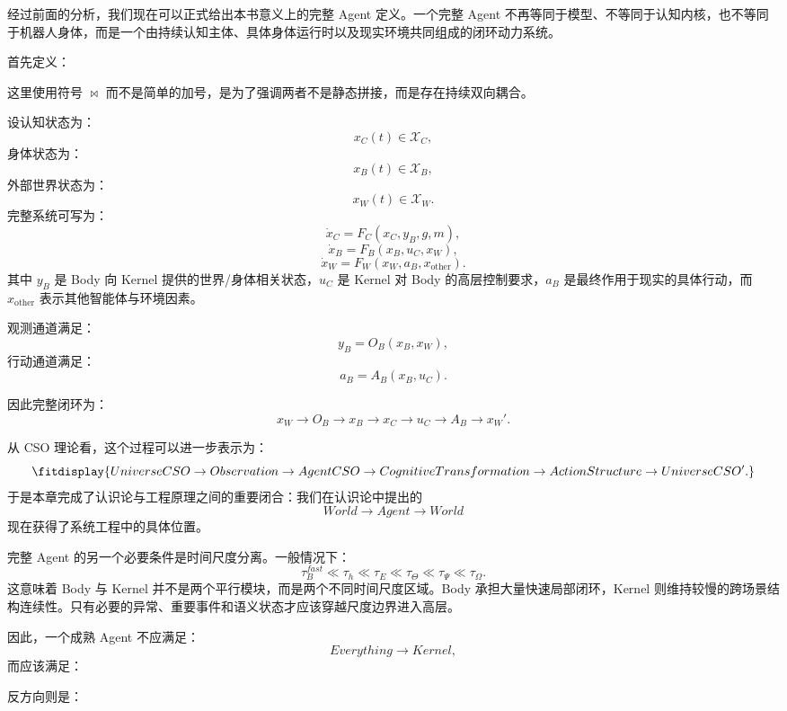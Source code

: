 经过前面的分析，我们现在可以正式给出本书意义上的完整 Agent 定义。一个完整 Agent 不再等同于模型、不等同于认知内核，也不等同于机器人身体，而是一个由持续认知主体、具体身体运行时以及现实环境共同组成的闭环动力系统。

首先定义：
\begin{statementbox}
\centering
{}
\end{statementbox}
这里使用符号 $\bowtie$ 而不是简单的加号，是为了强调两者不是静态拼接，而是存在持续双向耦合。

设认知状态为：
\[
x_C(t)\in\mathcal X_C,
\]
身体状态为：
\[
x_B(t)\in\mathcal X_B,
\]
外部世界状态为：
\[
x_W(t)\in\mathcal X_W.
\]
完整系统可写为：
\[
\dot{x}_C
=
F_C
\left(
x_C,
y_B,
g,
m
\right),
\]
\[
\dot{x}_B
=
F_B
\left(
x_B,
u_C,
x_W
\right),
\]
\[
\dot{x}_W
=
F_W
\left(
x_W,
a_B,
x_{\mathrm{other}}
\right).
\]
其中 $y_B$ 是 Body 向 Kernel 提供的世界/身体相关状态，$u_C$ 是 Kernel 对 Body 的高层控制要求，$a_B$ 是最终作用于现实的具体行动，而 $x_{\mathrm{other}}$ 表示其他智能体与环境因素。

观测通道满足：
\[
y_B
=
O_B
\left(
x_B,x_W
\right),
\]
行动通道满足：
\[
a_B
=
A_B
\left(
x_B,u_C
\right).
\]

因此完整闭环为：
\[
\boxed{
x_W
\rightarrow
O_B
\rightarrow
x_B
\rightarrow
x_C
\rightarrow
u_C
\rightarrow
A_B
\rightarrow
x_W'.
}
\]

从 CSO 理论看，这个过程可以进一步表示为：
\[
\fitdisplay{
UniverseCSO
\rightarrow
Observation
\rightarrow
AgentCSO
\rightarrow
CognitiveTransformation
\rightarrow
ActionStructure
\rightarrow
UniverseCSO'.
}
\]
于是本章完成了认识论与工程原理之间的重要闭合：我们在认识论中提出的
\[
World
\rightarrow
Agent
\rightarrow
World
\]
现在获得了系统工程中的具体位置。

完整 Agent 的另一个必要条件是时间尺度分离。一般情况下：
\[
\tau_B^{fast}
\ll
\tau_h
\ll
\tau_E
\ll
\tau_\Theta
\ll
\tau_\Psi
\ll
\tau_\Omega.
\]
这意味着 Body 与 Kernel 并不是两个平行模块，而是两个不同时间尺度区域。Body 承担大量快速局部闭环，Kernel 则维持较慢的跨场景结构连续性。只有必要的异常、重要事件和语义状态才应该穿越尺度边界进入高层。

因此，一个成熟 Agent 不应满足：
\[
Everything
\rightarrow
Kernel,
\]
而应该满足：
\begin{statementbox}
\centering
{}
\end{statementbox}
\begin{statementbox}
\centering
{}
\end{statementbox}
反方向则是：
\begin{statementbox}
\centering
{}
\end{statementbox}

